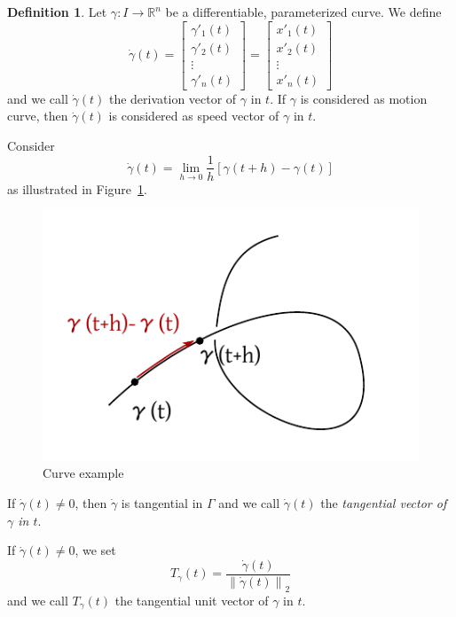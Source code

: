 \documentclass[a4paper,landscape,twocolumn]{article}
\theoremstyle{definition}
\newtheorem{defi}{Definition}
\newcommand\norm[1]{\left\|#1\right\|}
\begin{document}
\begin{defi}
  Let $\gamma: I \to \mathbb R^n$ be a differentiable, parameterized curve.
  We define
  \[
    \dot{\gamma}(t) =
    \begin{bmatrix} \gamma'_1(t) \\ \gamma'_2(t) \\ \vdots \\ \gamma'_n(t) \end{bmatrix}
    = \begin{bmatrix} x'_1(t) \\ x'_2(t) \\ \vdots \\ x'_n(t) \end{bmatrix}
  \]
  and we call $\dot\gamma(t)$ the derivation vector of $\gamma$ in $t$.
  If $\gamma$ is considered as motion curve, then $\dot\gamma(t)$ is considered as
  speed vector of $\gamma$ in $t$.

  Consider
  \[ \dot{\gamma}(t) = \lim_{h\to 0} \frac{1}{h} \left[\gamma(t + h) - \gamma(t)\right] \]
  as illustrated in Figure~\ref{img:curve_example}.

  \begin{figure}[!h]
    \begin{center}
      \includegraphics{img/curve_example.pdf}
      \caption{Curve example}
      \label{img:curve_example}
    \end{center}
  \end{figure}

  If $\dot{\gamma}(t) \neq 0$, then $\dot{\gamma}$ is tangential in $\Gamma$
  and we call $\dot\gamma(t)$ the \emph{tangential vector of $\gamma$ in $t$}.

  If $\dot\gamma(t) \neq 0$, we set
  \[ T_\gamma(t) = \frac{\dot\gamma(t)}{\norm{\dot\gamma(t)}_2} \]
  and we call $T_\gamma(t)$ the tangential unit vector of $\gamma$ in $t$.
\end{defi}
\end{document}
